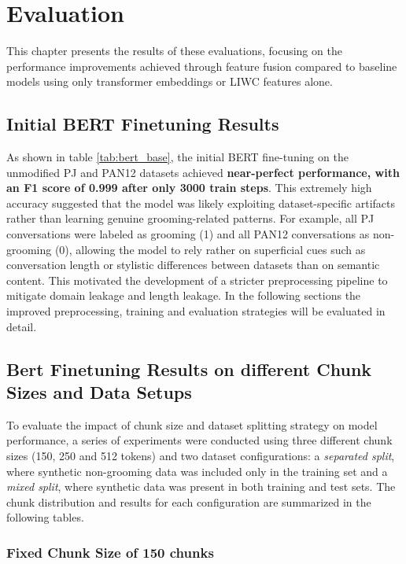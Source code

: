 \chapter{Evaluation} \label{sec:evaluation}
This chapter presents the results of these evaluations, focusing on the performance improvements achieved through feature fusion compared to baseline models using only transformer embeddings or LIWC features alone.

\section{Initial BERT Finetuning Results}

As shown in table \ref{tab:bert_base}, the initial BERT fine-tuning on the unmodified PJ and PAN12 datasets achieved \textbf{near-perfect performance, with an F1 score of 0.999 after only 3000 train steps}. This extremely high accuracy suggested that the model was likely exploiting dataset-specific artifacts rather than learning genuine grooming-related patterns. For example, all PJ conversations were labeled as grooming (1) and all PAN12 conversations as non-grooming (0), allowing the model to rely rather on superficial cues such as conversation length or stylistic differences between datasets than on semantic content. This motivated the development of a stricter preprocessing pipeline to mitigate domain leakage and length leakage. In the following sections the improved preprocessing, training and evaluation strategies will be evaluated in detail.

\newpage
\section{Bert Finetuning Results on different Chunk Sizes and Data Setups} \label{sec:bert_chunk_size_and_data_setup}

To evaluate the impact of chunk size and dataset splitting strategy on model performance, a series of experiments were conducted using three different chunk sizes (150, 250 and 512 tokens) and two dataset configurations: a \textit{separated split}, where synthetic non-grooming data was included only in the training set and a \textit{mixed split}, where synthetic data was present in both training and test sets. The chunk distribution and results for each configuration are summarized in the following tables.

\subsection{Fixed Chunk Size of 150 chunks}

